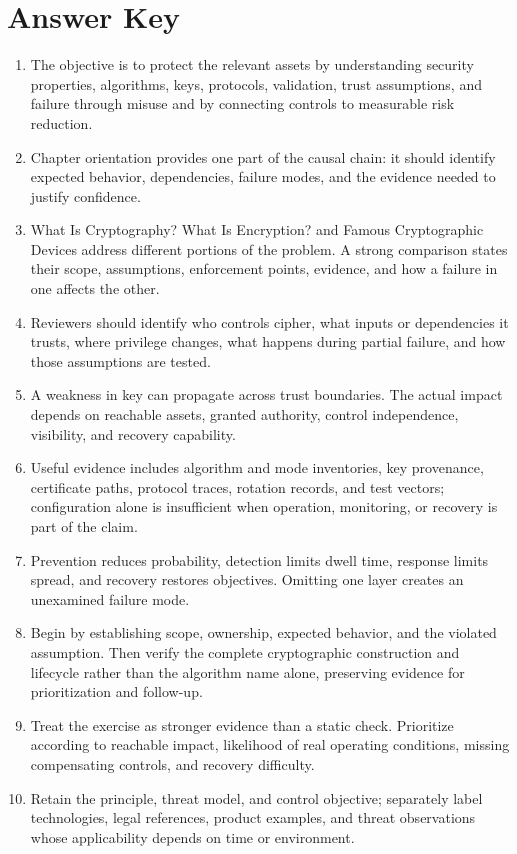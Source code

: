 \documentclass[11pt]{article}
\begin{document}
\section*{Answer Key}
\begin{enumerate}
\item The objective is to protect the relevant assets by understanding security properties, algorithms, keys, protocols, validation, trust assumptions, and failure through misuse and by connecting controls to measurable risk reduction.
\item Chapter orientation provides one part of the causal chain: it should identify expected behavior, dependencies, failure modes, and the evidence needed to justify confidence.
\item What Is Cryptography? What Is Encryption? and Famous Cryptographic Devices address different portions of the problem. A strong comparison states their scope, assumptions, enforcement points, evidence, and how a failure in one affects the other.
\item Reviewers should identify who controls cipher, what inputs or dependencies it trusts, where privilege changes, what happens during partial failure, and how those assumptions are tested.
\item A weakness in key can propagate across trust boundaries. The actual impact depends on reachable assets, granted authority, control independence, visibility, and recovery capability.
\item Useful evidence includes algorithm and mode inventories, key provenance, certificate paths, protocol traces, rotation records, and test vectors; configuration alone is insufficient when operation, monitoring, or recovery is part of the claim.
\item Prevention reduces probability, detection limits dwell time, response limits spread, and recovery restores objectives. Omitting one layer creates an unexamined failure mode.
\item Begin by establishing scope, ownership, expected behavior, and the violated assumption. Then verify the complete cryptographic construction and lifecycle rather than the algorithm name alone, preserving evidence for prioritization and follow-up.
\item Treat the exercise as stronger evidence than a static check. Prioritize according to reachable impact, likelihood of real operating conditions, missing compensating controls, and recovery difficulty.
\item Retain the principle, threat model, and control objective; separately label technologies, legal references, product examples, and threat observations whose applicability depends on time or environment.
\end{enumerate}
\end{document}
